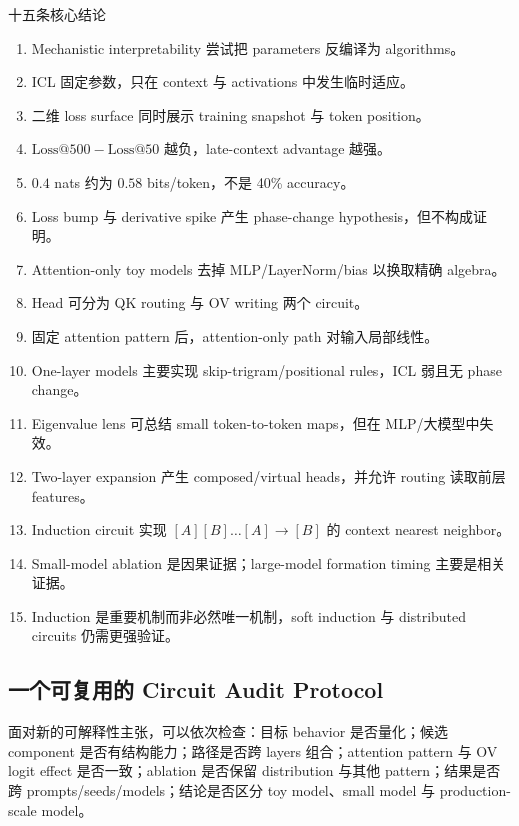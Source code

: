 \documentclass[a4paper]{article}
\begin{document}
\begin{importantbox}{十五条核心结论}
\begin{enumerate}
  \item Mechanistic interpretability 尝试把 parameters 反编译为 algorithms。
  \item ICL 固定参数，只在 context 与 activations 中发生临时适应。
  \item 二维 loss surface 同时展示 training snapshot 与 token position。
  \item $\mathrm{Loss@500}-\mathrm{Loss@50}$ 越负，late-context advantage 越强。
  \item $0.4$ nats 约为 $0.58$ bits/token，不是 40\% accuracy。
  \item Loss bump 与 derivative spike 产生 phase-change hypothesis，但不构成证明。
  \item Attention-only toy models 去掉 MLP/LayerNorm/bias 以换取精确 algebra。
  \item Head 可分为 QK routing 与 OV writing 两个 circuit。
  \item 固定 attention pattern 后，attention-only path 对输入局部线性。
  \item One-layer models 主要实现 skip-trigram/positional rules，ICL 弱且无 phase change。
  \item Eigenvalue lens 可总结 small token-to-token maps，但在 MLP/大模型中失效。
  \item Two-layer expansion 产生 composed/virtual heads，并允许 routing 读取前层 features。
  \item Induction circuit 实现 $[A][B]\ldots[A]\to[B]$ 的 context nearest neighbor。
  \item Small-model ablation 是因果证据；large-model formation timing 主要是相关证据。
  \item Induction 是重要机制而非必然唯一机制，soft induction 与 distributed circuits 仍需更强验证。
\end{enumerate}
\end{importantbox}

\subsection{一个可复用的 Circuit Audit Protocol}

面对新的可解释性主张，可以依次检查：目标 behavior 是否量化；候选 component 是否有结构能力；路径是否跨 layers 组合；attention pattern 与 OV logit effect 是否一致；ablation 是否保留 distribution 与其他 pattern；结果是否跨 prompts/seeds/models；结论是否区分 toy model、small model 与 production-scale model。
\end{document}
